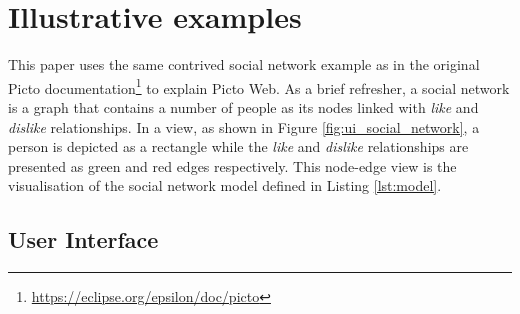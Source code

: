 \documentclass[preprint,12pt, a4paper]{elsarticle}
\begin{document}
\section{Illustrative examples}

This paper uses the same contrived social network example as in the original Picto documentation\footnote{\url{https://eclipse.org/epsilon/doc/picto}} to explain Picto Web. As a brief refresher, a social network is a graph that contains a number of people as its nodes linked with \emph{like} and \emph{dislike} relationships. In a view, as shown in Figure \ref{fig:ui_social_network}, a person is depicted as a rectangle while the \emph{like} and \emph{dislike} relationships are presented as green and red edges respectively. This node-edge view is the visualisation of the social network model defined in Listing \ref{lst:model}.

\subsection{User Interface}
\label{sec:user_interface}
\end{document}
